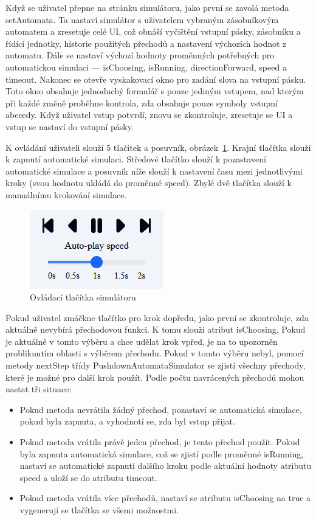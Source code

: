 Když se uživatel přepne na stránku simulátoru, jako první se zavolá metoda setAutomata. Ta nastaví simulátor s uživatelem vybraným zásobníkovým automatem a zresetuje celé UI, což obnáší vyčištění vstupní pásky, zásobníku a řídící jednotky, historie použitých přechodů a nastavení výchozích hodnot z automatu. Dále se nastaví výchozí hodnoty proměnných potřebných pro automatickou simulaci --- isChoosing, isRunning, directionForward, speed a timeout. Nakonec se otevře vyskakovací okno pro zadání slova na vstupní pásku. Toto okno obsahuje jednoduchý formulář s pouze jediným vstupem, nad kterým při každé změně proběhne kontrola, zda obsahuje pouze symboly vstupní abecedy. Když uživatel vstup potvrdí, znovu se zkontroluje, zresetuje se UI a vstup se nastaví do vstupní pásky.

K ovládání uživateli slouží 5 tlačítek a posuvník, obrázek~\ref{fig:SimulatorButtons}. Krajní tlačítka slouží k zapnutí automatické simulaci. Středové tlačítko slouží k pozastavení automatické simulace a posuvník níže slouží k nastavení času mezi jednotlivými kroky (svou hodnotu ukládá do proměnné speed). Zbylé dvě tlačítka slouží k manuálnímu krokování simulace.

\begin{figure}[h]
    \centering
    \includegraphics{Figures/PrntScrn_SimulatorButtons.png}
    \caption{Ovládací tlačítka simulátoru}\label{fig:SimulatorButtons}
\end{figure}

Pokud uživatel zmáčkne tlačítko pro krok dopředu, jako první se zkontroluje, zda aktuálně nevybírá přechodovou funkci. K tomu slouží atribut isChoosing. Pokud je aktuálně v tomto výběru a chce udělat krok vpřed, je na to upozorněn probliknutím oblasti s výběrem přechodu. Pokud v tomto výběru nebyl, pomocí metody nextStep třídy PushdownAutomataSimulator se zjistí všechny přechody, které je možné pro další krok použít. Podle počtu navrácených přechodů mohou nastat tři situace:
\begin{itemize}
    \item Pokud metoda nevrátila žádný přechod, pozastaví se automatická simulace, pokud byla zapnuta, a vyhodnotí se, zda byl vstup přijat.
    \item  Pokud metoda vrátila právě jeden přechod, je tento přechod použit. Pokud byla zapnuta automatická simulace, což se zjistí podle proměnné isRunning, nastaví se automatické zapnutí dalšího kroku podle aktuální hodnoty atributu speed a uloží se do atributu timeout.
    \item Pokud metoda vrátila více přechodů, nastaví se atributu isChoosing na true a vygenerují se tlačítka se všemi možnostmi.
\end{itemize}

